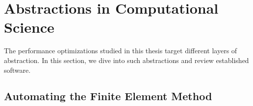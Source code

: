 %




\section{Abstractions in Computational Science}
\label{sec:bkg:abstractions}

The performance optimizations studied in this thesis target different layers of abstraction. In this section, we dive into such abstractions and review established software. 



\subsection{Automating the Finite Element Method}
\label{sec:bkg:fenics-and-firedrake}

